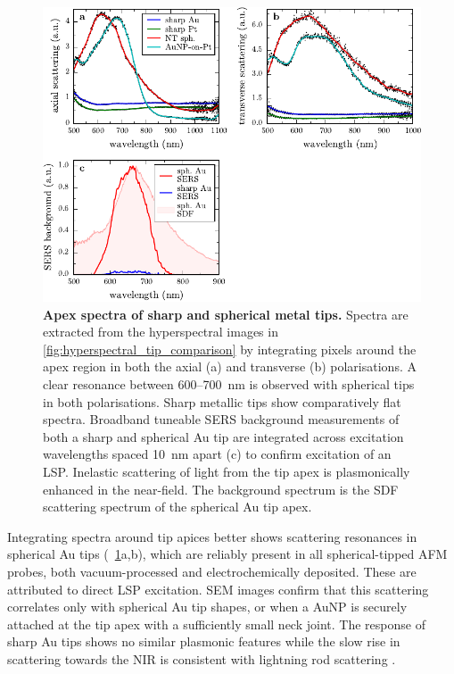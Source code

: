 \documentclass{article}
\begin{document}
\begin{figure}[bt]
\centering
\includegraphics{figures/apex_spectra_comparison}
\caption[Apex spectra of sharp and spherical metal tips]{\textbf{Apex spectra of sharp and spherical metal tips.} Spectra are extracted from the hyperspectral images in \autoref{fig:hyperspectral_tip_comparison} by integrating pixels around the apex region in both the axial (a) and transverse (b) polarisations. A clear resonance between 600--\SI{700}{nm} is observed with spherical tips in both polarisations. Sharp metallic tips show comparatively flat spectra.
Broadband tuneable SERS background measurements of both a sharp and spherical Au tip are integrated across excitation wavelengths spaced \SI{10}{nm} apart (c) to confirm excitation of an LSP. Inelastic scattering of light from the tip apex is plasmonically enhanced in the near-field. The background spectrum is the SDF scattering spectrum of the spherical Au tip apex.
}
\label{fig:apex_spectra}
\vspace{-5pt}
\end{figure}

Integrating spectra around tip apices better shows scattering resonances in spherical Au tips (\figurename~\ref{fig:apex_spectra}a,b), which are reliably present in all spherical-tipped AFM probes, both vacuum-processed and electrochemically deposited. These are attributed to direct LSP excitation. SEM images confirm that this scattering correlates only with spherical Au tip shapes, or when a AuNP is securely attached at the tip apex with a sufficiently small neck joint. The response of sharp Au tips shows no similar plasmonic features while the slow rise in scattering towards the NIR is consistent with lightning rod scattering \cite{zhang2009}.
\end{document}
